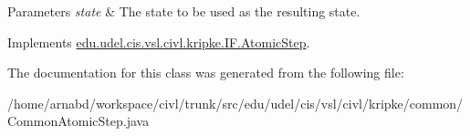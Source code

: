 \begin{DoxyParams}{Parameters}
{\em state} & The state to be used as the resulting state. \\
\hline
\end{DoxyParams}


Implements \hyperlink{interfaceedu_1_1udel_1_1cis_1_1vsl_1_1civl_1_1kripke_1_1IF_1_1AtomicStep_a559b04f1977b61c5054a2cd7f358cd31}{edu.\+udel.\+cis.\+vsl.\+civl.\+kripke.\+I\+F.\+Atomic\+Step}.



The documentation for this class was generated from the following file\+:\begin{DoxyCompactItemize}
\item 
/home/arnabd/workspace/civl/trunk/src/edu/udel/cis/vsl/civl/kripke/common/Common\+Atomic\+Step.\+java\end{DoxyCompactItemize}

